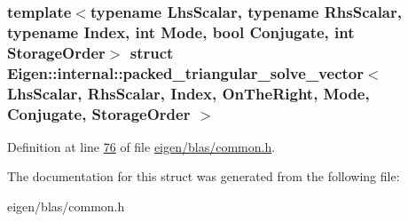 \subsubsection*{template$<$typename Lhs\+Scalar, typename Rhs\+Scalar, typename Index, int Mode, bool Conjugate, int Storage\+Order$>$\newline
struct Eigen\+::internal\+::packed\+\_\+triangular\+\_\+solve\+\_\+vector$<$ Lhs\+Scalar, Rhs\+Scalar, Index, On\+The\+Right, Mode, Conjugate, Storage\+Order $>$}



Definition at line \hyperlink{eigen_2blas_2common_8h_source_l00076}{76} of file \hyperlink{eigen_2blas_2common_8h_source}{eigen/blas/common.\+h}.



The documentation for this struct was generated from the following file\+:\begin{DoxyCompactItemize}
\item 
eigen/blas/common.\+h\end{DoxyCompactItemize}
